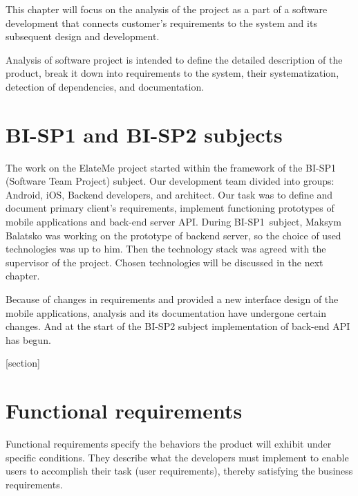 This chapter will focus on the analysis of the project as a part of a software development that connects customer's
requirements to the system and its subsequent design and development.

Analysis of software project is intended to define the detailed description of the product, break it down into
requirements to the system, their systematization, detection of dependencies, and documentation.


\section{BI-SP1 and BI-SP2 subjects}
The work on the ElateMe project started within the framework of the BI-SP1 (Software Team Project) subject. Our development team divided into groups: Android, iOS, Backend developers, and architect. Our task was to define and document primary client's requirements, implement functioning prototypes of mobile applications and back-end server \ac{API}. During BI-SP1~subject, Maksym Balatsko was working on the prototype of backend server, so the choice of used technologies was up to him. Then the technology stack was agreed with the supervisor of the project. Chosen technologies will be discussed in the next chapter.

Because of changes in requirements and provided a new interface design of the mobile applications, analysis and its documentation have undergone certain changes. And at the start of the BI-SP2 subject implementation of back-end API has begun.

[section]
\newcommand{\req}[2]{\setlength\itemsep{-0.1em}
\stepcounter{reqcounter}
\item[\textbf{#1\arabic{reqcounter}}] \textbf{#2}.}
\newcommand{\funcreq}[1]{\req{F}{#1}}
\newcommand{\nonfreq}[1]{\req{N}{#1}}

\section{Functional requirements}
Functional requirements specify the behaviors the product will exhibit under specific conditions. They describe what the developers must implement to enable users to accomplish their task (user requirements), thereby satisfying the business requirements. \cite{funcreq}

